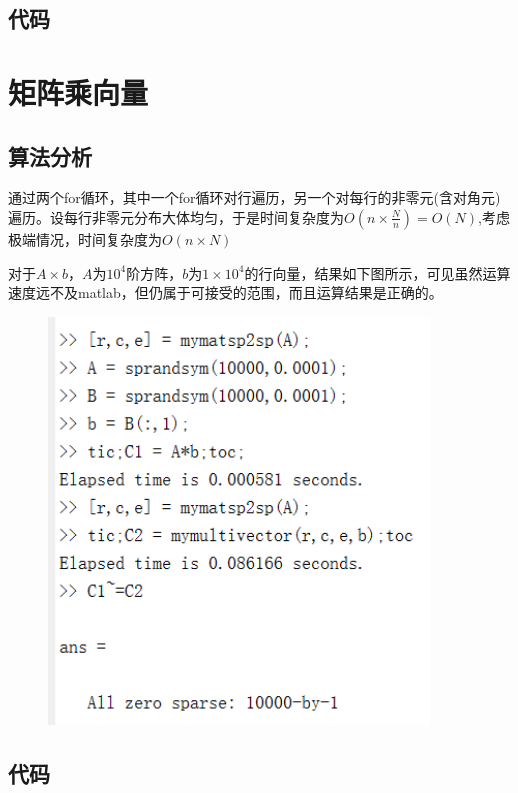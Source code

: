 \documentclass[a4paper,left=2.5cm,right=2.5cm]{article}
\begin{document}
\begin{spacing}{1.6}
		\subsection{代码}
		
		\section{矩阵乘向量}
		\subsection{算法分析}
		通过两个for循环，其中一个for循环对行遍历，另一个对每行的非零元(含对角元)遍历。设每行非零元分布大体均匀，于是时间复杂度为$O(n\times \frac{N}{n}) = O(N)$,考虑极端情况，时间复杂度为$O(n\times N)$
		
		对于$A\times b$，$A$为$10^4$阶方阵，$b$为$1\times 10^4$的行向量，结果如下图所示，可见虽然运算速度远不及matlab，但仍属于可接受的范围，而且运算结果是正确的。
		\begin{figure}[H]
			\includegraphics[width=0.9\textwidth]{image/multivector_result1.png}
		\end{figure}
		\subsection{代码}
		
		

\end{spacing}
\end{document}
